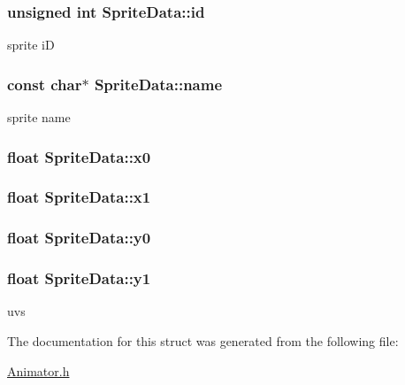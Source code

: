 \subsubsection[{id}]{\setlength{\rightskip}{0pt plus 5cm}unsigned int Sprite\+Data\+::id}\label{struct_sprite_data_a0e22de2e782f60b1ffb5697cf72824cd}


sprite i\+D 

\hypertarget{struct_sprite_data_a942d4fe5b3d2cb84315282ad34e3f64f}{}
\subsubsection[{name}]{\setlength{\rightskip}{0pt plus 5cm}const char$\ast$ Sprite\+Data\+::name}\label{struct_sprite_data_a942d4fe5b3d2cb84315282ad34e3f64f}


sprite name 

\hypertarget{struct_sprite_data_a726087f7ea88f2cd8c0841e2c3923628}{}
\subsubsection[{x0}]{\setlength{\rightskip}{0pt plus 5cm}float Sprite\+Data\+::x0}\label{struct_sprite_data_a726087f7ea88f2cd8c0841e2c3923628}
\hypertarget{struct_sprite_data_a0dda77ba2d31603e1a71c9b76c5db221}{}
\subsubsection[{x1}]{\setlength{\rightskip}{0pt plus 5cm}float Sprite\+Data\+::x1}\label{struct_sprite_data_a0dda77ba2d31603e1a71c9b76c5db221}
\hypertarget{struct_sprite_data_a8c06fce0212a7a8358d59670cf77210b}{}
\subsubsection[{y0}]{\setlength{\rightskip}{0pt plus 5cm}float Sprite\+Data\+::y0}\label{struct_sprite_data_a8c06fce0212a7a8358d59670cf77210b}
\hypertarget{struct_sprite_data_a90665db5ae717daab6bcb2726f3fab50}{}
\subsubsection[{y1}]{\setlength{\rightskip}{0pt plus 5cm}float Sprite\+Data\+::y1}\label{struct_sprite_data_a90665db5ae717daab6bcb2726f3fab50}


uvs 



The documentation for this struct was generated from the following file\+:\begin{DoxyCompactItemize}
\item 
\hyperlink{_animator_8h}{Animator.\+h}\end{DoxyCompactItemize}
